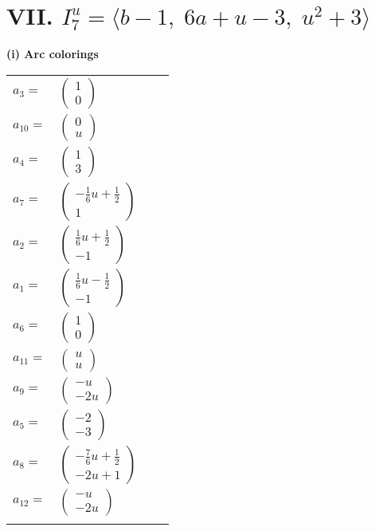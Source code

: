 \documentclass[1p]{elsarticle_modified}
\theoremstyle{definition}
\begin{document}
\centering \section*{VII. $I^u_{7}= \langle b-1,\;6 a+u-3,\;u^2+3 \rangle$}
\flushleft \textbf{(i) Arc colorings}\\
\begin{tabular}{m{7pt} m{180pt} m{7pt} m{180pt} }
\flushright $a_{3}=$&$\begin{pmatrix}1\\0\end{pmatrix}$ \\
\flushright $a_{10}=$&$\begin{pmatrix}0\\u\end{pmatrix}$ \\
\flushright $a_{4}=$&$\begin{pmatrix}1\\3\end{pmatrix}$ \\
\flushright $a_{7}=$&$\begin{pmatrix}-\frac{1}{6} u+\frac{1}{2}\\1\end{pmatrix}$ \\
\flushright $a_{2}=$&$\begin{pmatrix}\frac{1}{6} u+\frac{1}{2}\\-1\end{pmatrix}$ \\
\flushright $a_{1}=$&$\begin{pmatrix}\frac{1}{6} u-\frac{1}{2}\\-1\end{pmatrix}$ \\
\flushright $a_{6}=$&$\begin{pmatrix}1\\0\end{pmatrix}$ \\
\flushright $a_{11}=$&$\begin{pmatrix}u\\u\end{pmatrix}$ \\
\flushright $a_{9}=$&$\begin{pmatrix}- u\\-2 u\end{pmatrix}$ \\
\flushright $a_{5}=$&$\begin{pmatrix}-2\\-3\end{pmatrix}$ \\
\flushright $a_{8}=$&$\begin{pmatrix}-\frac{7}{6} u+\frac{1}{2}\\-2 u+1\end{pmatrix}$ \\
\flushright $a_{12}=$&$\begin{pmatrix}- u\\-2 u\end{pmatrix}$\\&\end{tabular}
\end{document}
